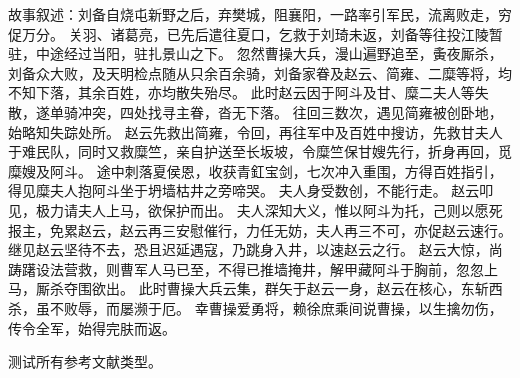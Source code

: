 故事叙述：刘备自烧屯新野之后，弃樊城，阻襄阳，一路率引军民，流离败走，穷促万分。
关羽、诸葛亮，已先后遣往夏口，乞救于刘琦未返，刘备等往投江陵暂驻，中途经过当阳，驻扎景山之下。
忽然曹操大兵，漫山遍野追至，夤夜厮杀，刘备众大败，及天明检点随从只余百余骑，刘备家眷及赵云、简雍、二糜等将，均不知下落，其余百姓，亦均散失殆尽。
此时赵云因于阿斗及甘、糜二夫人等失散，遂单骑冲突，四处找寻主眷，沓无下落。
往回三数次，遇见简雍被创卧地，始略知失踪处所。
赵云先救出简雍，令回，再往军中及百姓中搜访，先救甘夫人于难民队，同时又救糜竺，亲自护送至长坂坡，令糜竺保甘嫂先行，折身再回，觅糜嫂及阿斗。
途中刺落夏侯恩，收获青釭宝剑，七次冲入重围，方得百姓指引，得见糜夫人抱阿斗坐于坍墙枯井之旁啼哭。
夫人身受数创，不能行走。
赵云叩见，极力请夫人上马，欲保护而出。
夫人深知大义，惟以阿斗为托，己则以愿死报主，免累赵云，赵云再三安慰催行，力任无妨，夫人再三不可，亦促赵云速行。
继见赵云坚待不去，恐且迟延遇寇，乃跳身入井，以速赵云之行。
赵云大惊，尚踌躇设法营救，则曹军人马已至，不得已推墙掩井，解甲藏阿斗于胸前，忽忽上马，厮杀夺围欲出。
此时曹操大兵云集，群矢于赵云一身，赵云在核心，东斩西杀，虽不败辱，而屡濒于厄。
幸曹操爱勇将，赖徐庶乘间说曹操，以生擒勿伤，传令全军，始得完肤而返。

测试所有参考文献类型\cite{CITATION_BOOK,CITATION_ARTICLE,CITATION_PROCEEDINGS,CITATION_INPROCEEDINGS,CITATION_TECHREPORT,CITATION_STANDARD,CITATION_PATENT,CITATION_NEWSPAPER,CITATION_ELECTRONIC}。

\ifx\usechapbib\empty
\nocite{BSTcontrol}
\setcounter{NAT@ctr}{0}


\fi
